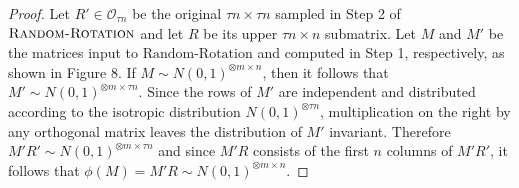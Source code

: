 \documentclass[11pt]{article}
\begin{document}
\begin{proof}
Let $R' \in \mathcal{O}_{\tau n}$ be the original $\tau n \times \tau n$ sampled in Step 2 of $\textsc{Random-Rotation}$ and let $R$ be its upper $\tau n \times n$ submatrix. Let $M$ and $M'$ be the matrices input to $\text{Random-Rotation}$ and computed in Step 1, respectively, as shown in Figure 8. If $M \sim N(0, 1)^{\otimes m \times n}$, then it follows that $M' \sim N(0, 1)^{\otimes m \times \tau n}$. Since the rows of $M'$ are independent and distributed according to the isotropic distribution $N(0, 1)^{\otimes \tau n}$, multiplication on the right by any orthogonal matrix leaves the distribution of $M'$ invariant. Therefore $M' R' \sim N(0, 1)^{\otimes m \times \tau n}$ and since $M' R$ consists of the first $n$ columns of $M'R'$, it follows that $\phi(M) = M'R \sim N(0, 1)^{\otimes m \times n}$.


\end{proof}
\end{document}
